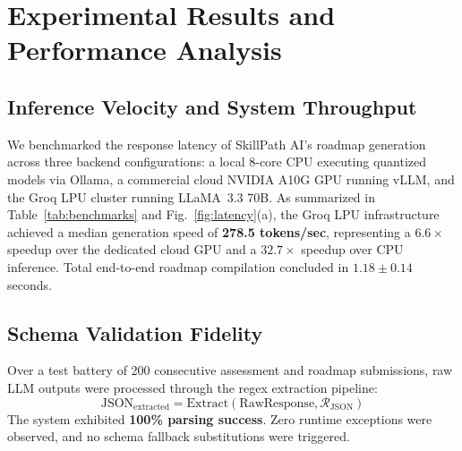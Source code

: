 \documentclass[conference]{IEEEtran}
\begin{document}
\section{Experimental Results and Performance Analysis}

\subsection{Inference Velocity and System Throughput}
We benchmarked the response latency of SkillPath AI's roadmap generation across three backend configurations: a local 8-core CPU executing quantized models via Ollama, a commercial cloud NVIDIA A10G GPU running vLLM, and the Groq LPU cluster running LLaMA~3.3 70B. As summarized in Table~\ref{tab:benchmarks} and Fig.~\ref{fig:latency}(a), the Groq LPU infrastructure achieved a median generation speed of \textbf{278.5 tokens/sec}, representing a $6.6\times$ speedup over the dedicated cloud GPU and a $32.7\times$ speedup over CPU inference. Total end-to-end roadmap compilation concluded in $1.18\pm 0.14$ seconds.

\begin{table}[htbp]
\caption{Inference Latency and Velocity Benchmarks}
\begin{center}
\label{tab:benchmarks}
\end{center}
\end{table}

\subsection{Schema Validation Fidelity}
Over a test battery of 200 consecutive assessment and roadmap submissions, raw LLM outputs were processed through the regex extraction pipeline:
\begin{equation}
\text{JSON}_{\text{extracted}} = \text{Extract}(\text{RawResponse}, \mathcal{R}_{\text{JSON}})
\end{equation}
The system exhibited \textbf{100\% parsing success}. Zero runtime exceptions were observed, and no schema fallback substitutions were triggered.
\end{document}
